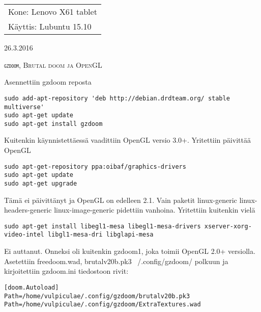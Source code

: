 \documentclass[main.tex]{subfiles}
\begin{document}
\thispagestyle{empty}
\begin{tabular}[t]{l}
Kone: Lenovo X61 tablet\\
Käyttis: Lubuntu 15.10
\end{tabular}
\hfill 26.3.2016

{\scshape\Large{\texttt{gzdoom}, Brutal doom ja OpenGL}}

Asennettiin gzdoom reposta

\begin{lstlisting}
sudo add-apt-repository 'deb http://debian.drdteam.org/ stable multiverse'
sudo apt-get update
sudo apt-get install gzdoom
\end{lstlisting}

Kuitenkin käynnistettäessä vaadittiin OpenGL versio 3.0+. Yritettiin päivittää OpenGL

\begin{lstlisting}
sudo apt-get-repository ppa:oibaf/graphics-drivers
sudo apt-get update
sudo apt-get upgrade
\end{lstlisting}

Tämä ei päivittänyt ja OpenGL on edelleen 2.1. Vain paketit linux-generic linux-headers-generic linux-image-generic pidettiin vanhoina. Yritettiin kuitenkin vielä

\begin{lstlisting}
sudo apt-get install libegl1-mesa libegl1-mesa-drivers xserver-xorg-video-intel libgl1-mesa-dri libglapi-mesa
\end{lstlisting}

Ei auttanut. Onneksi oli kuitenkin gzdoom1, joka toimii OpenGL 2.0+ versiolla. Asetettiin freedoom.wad, brutalv20b.pk3 ~/.config/gzdoom/ polkuun ja kirjoitettiin gzdoom.ini tiedostoon rivit:

\begin{lstlisting}
[doom.Autoload]
Path=/home/vulpiculae/.config/gzdoom/brutalv20b.pk3
Path=/home/vulpiculae/.config/gzdoom/ExtraTextures.wad
\end{lstlisting}
\end{document}
